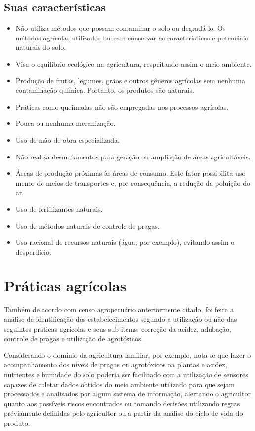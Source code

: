 \subsection{Suas características}

\begin{itemize}
	\item Não utiliza métodos que possam contaminar o solo ou degradá-lo. Os métodos agrícolas utilizados buscam conservar as características e potenciais naturais do solo.
	\item Visa o equilíbrio ecológico na agricultura, respeitando assim o meio ambiente.
	\item Produção de frutas, legumes, grãos e outros gêneros agrícolas sem nenhuma contaminação química. Portanto, os produtos são naturais.
	\item Práticas como queimadas não são empregadas nos processos agrícolas.
	\item Pouca ou nenhuma mecanização.
	\item Uso de mão-de-obra especializada.
	\item Não realiza desmatamentos para geração ou ampliação de áreas agricultáveis.
	\item Áreas de produção próximas às áreas de consumo. Este fator possibilita uso menor de meios de transportes e, por consequência, a redução da poluição do ar.
	\item Uso de fertilizantes naturais.
	\item Uso de métodos naturais de controle de pragas.
	\item Uso racional de recursos naturais (água, por exemplo), evitando assim o desperdício.
	
\end{itemize}


\section{Práticas agrícolas}

Também de acordo com censo agropecuário \cite{CENSOAGRO2006} anteriormente citado, foi feita a análise de identificação dos estabelecimentos segundo a utilização ou não das seguintes práticas agrícolas e seus sub-items: correção da acidez, adubação, controle de pragas e utilização de agrotóxicos.

Considerando o domínio da agricultura familiar, por exemplo, nota-se que fazer o acompanhamento dos níveis de pragas ou agrotóxicos na plantas e acidez, nutrientes e humidade do solo poderia ser facilitado com a utilização de sensores capazes de coletar dados obtidos do meio ambiente utilizado para que sejam processados e analisados por algum sistema de informação, alertando o agricultor quanto aos possíveis riscos encontrados ou tomando decisões utilizando regras préviamente definidas pelo agricultor ou a partir da análise do ciclo de vida do produto. 

